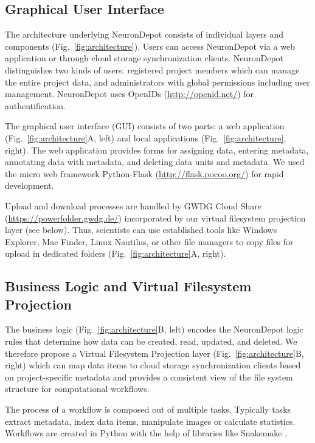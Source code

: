 \documentclass{frontiersSCNS} %
\begin{document}
\subsection{Graphical User Interface}
The architecture underlying NeuronDepot consists of individual layers and
components (Fig.~\ref{fig:architecture}). Users can access NeuronDepot via a
web application or through cloud storage synchronization clients. NeuronDepot
distinguishes two kinds of users: registered project members which can manage
the entire project data, and administrators with global permissions including
user management. NeuronDepot uses OpenIDs (\url{http://openid.net/}) for
authentification.

The graphical user interface (GUI) consists of two parts: a web application
(Fig.~\ref{fig:architecture}A, left) and local applications
(Fig.~\ref{fig:architecture}, right). The web application provides forms for
assigning data, entering metadata, annotating data with metadata, and deleting
data units and metadata. We used the micro web framework Python-Flask
(\url{http://flask.pocoo.org/}) for rapid development.

Upload and download processes are handled by GWDG Cloud Share
(\url{https://powerfolder.gwdg.de/}) incorporated by our virtual filesystem
projection layer (see below). Thus, scientists can use established tools like
Windows Explorer, Mac Finder, Linux Nautilus, or other file managers to copy
files for upload in dedicated folders (Fig.~\ref{fig:architecture}A, right). 

\subsection{Business Logic and Virtual Filesystem Projection}\label{sec:projection_layer}

The business logic (Fig.~\ref{fig:architecture}B, left) encodes the NeuronDepot
logic rules that determine how data can be created, read, updated, and deleted.
We therefore propose a
Virtual Filesystem Projection layer (Fig.~\ref{fig:architecture}B, right) which
can map data items to cloud storage synchronization clients
based on project-specific metadata and provides a consistent view of the file
system structure for computational workflows.

The process of a workflow is composed out of multiple tasks. Typically
tasks extract metadata, index data items, manipulate images or calculate
statistics. Workflows are created in Python with the help of libraries like
Snakemake \citep{Koester2012}.
\end{document}
